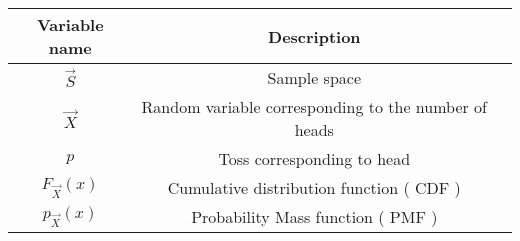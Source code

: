 \begin{center}
\begin{tabular}{|c|c|c|}
\hline 
\textbf{Variable name} & \textbf{Description} \\
\hline 
$\vec{S}$ & Sample space \\
\hline 
$\vec{X}$ & Random variable corresponding to the number of heads \\
\hline
$p$ & Toss corresponding to head \\
\hline
$F_{\vec{X}} (x)$ & Cumulative distribution function ( CDF ) \\
\hline
$p_{\vec{X}} (x)$ & Probability Mass function ( PMF ) \\
\hline
\end{tabular}
\end{center}
